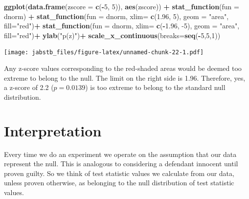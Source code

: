 \documentclass[]{book}
\newenvironment{Shaded}{\begin{snugshade}}{\end{snugshade}}
\newcommand{\DataTypeTok}[1]{\textcolor[rgb]{0.13,0.29,0.53}{#1}}
\newcommand{\DecValTok}[1]{\textcolor[rgb]{0.00,0.00,0.81}{#1}}
\newcommand{\FloatTok}[1]{\textcolor[rgb]{0.00,0.00,0.81}{#1}}
\newcommand{\KeywordTok}[1]{\textcolor[rgb]{0.13,0.29,0.53}{\textbf{#1}}}
\newcommand{\NormalTok}[1]{#1}
\newcommand{\OperatorTok}[1]{\textcolor[rgb]{0.81,0.36,0.00}{\textbf{#1}}}
\newcommand{\StringTok}[1]{\textcolor[rgb]{0.31,0.60,0.02}{#1}}
\begin{document}
\begin{Shaded}
\begin{Highlighting}[]
\KeywordTok{ggplot}\NormalTok{(}\KeywordTok{data.frame}\NormalTok{(}\DataTypeTok{zscore =} \KeywordTok{c}\NormalTok{(}\OperatorTok{-}\DecValTok{5}\NormalTok{, }\DecValTok{5}\NormalTok{)), }\KeywordTok{aes}\NormalTok{(zscore)) }\OperatorTok{+}
\StringTok{  }\KeywordTok{stat_function}\NormalTok{(}\DataTypeTok{fun =}\NormalTok{ dnorm) }\OperatorTok{+}
\StringTok{  }\KeywordTok{stat_function}\NormalTok{(}\DataTypeTok{fun =}\NormalTok{ dnorm,}
                \DataTypeTok{xlim=} \KeywordTok{c}\NormalTok{(}\FloatTok{1.96}\NormalTok{, }\DecValTok{5}\NormalTok{),}
                \DataTypeTok{geom =} \StringTok{"area"}\NormalTok{, }\DataTypeTok{fill=}\StringTok{"red"}\NormalTok{)}\OperatorTok{+}
\StringTok{  }\KeywordTok{stat_function}\NormalTok{(}\DataTypeTok{fun =}\NormalTok{ dnorm,}
                \DataTypeTok{xlim=} \KeywordTok{c}\NormalTok{(}\OperatorTok{-}\FloatTok{1.96}\NormalTok{, }\DecValTok{-5}\NormalTok{),}
                \DataTypeTok{geom =} \StringTok{"area"}\NormalTok{, }\DataTypeTok{fill=}\StringTok{"red"}\NormalTok{)}\OperatorTok{+}
\StringTok{  }\KeywordTok{ylab}\NormalTok{(}\StringTok{"p(z)"}\NormalTok{)}\OperatorTok{+}
\StringTok{  }\KeywordTok{scale_x_continuous}\NormalTok{(}\DataTypeTok{breaks=}\KeywordTok{seq}\NormalTok{(}\OperatorTok{-}\DecValTok{5}\NormalTok{,}\DecValTok{5}\NormalTok{,}\DecValTok{1}\NormalTok{))}
\end{Highlighting}
\end{Shaded}

\texttt{[image: jabstb\_files/figure-latex/unnamed-chunk-22-1.pdf]}

Any z-score values corresponding to the red-shaded areas would be deemed too extreme to belong to the null. The limit on the right side is 1.96. Therefore, yes, a z-score of 2.2 (\(p=0.0139\)) is too extreme to belong to the standard null distribution.

\hypertarget{interpretation}{%
\section{Interpretation}\label{interpretation}}

Every time we do an experiment we operate on the assumption that our data represent the null. This is analogous to considering a defendant innocent until proven guilty. So we think of test statistic values we calculate from our data, unless proven otherwise, as belonging to the null distribution of test statistic values.
\end{document}
